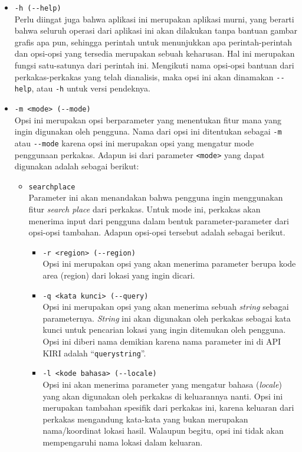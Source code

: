 \begin{itemize}
	\item \verb|-h (--help)|\\
	Perlu diingat juga bahwa aplikasi ini merupakan aplikasi \cl\xspace murni, yang berarti bahwa seluruh operasi dari aplikasi ini akan dilakukan tanpa bantuan gambar grafis apa pun, sehingga perintah untuk menunjukkan apa perintah-perintah dan opsi-opsi yang tersedia merupakan sebuah keharusan. Hal ini merupakan fungsi satu-satunya dari perintah ini. Mengikuti nama opsi-opsi bantuan dari perkakas-perkakas yang telah dianalisis, maka opsi ini akan dinamakan \verb|--help|, atau \verb|-h| untuk versi pendeknya.
	\newpage\vspace*{-1.5em} %
	\item \verb|-m <mode> (--mode)|\\
	Opsi ini merupakan opsi berparameter yang menentukan fitur mana yang ingin digunakan oleh pengguna. Nama dari opsi ini ditentukan sebagai \verb|-m| atau \verb|--mode| karena opsi ini merupakan opsi yang mengatur mode penggunaan perkakas. Adapun isi dari parameter \verb|<mode>| yang dapat digunakan adalah sebagai berikut:
	
	\begin{itemize}	
		\item \verb|searchplace|\\
		Parameter ini akan menandakan bahwa pengguna ingin menggunakan fitur \textit{search place} dari perkakas. Untuk mode ini, perkakas akan menerima input dari pengguna dalam bentuk parameter-parameter dari opsi-opsi tambahan. Adapun opsi-opsi tersebut adalah sebagai berikut.
		
		\begin{itemize}
			\item \verb|-r <region> (--region)|\\
			Opsi ini merupakan opsi yang akan menerima parameter berupa kode area (region) dari lokasi yang ingin dicari.
			\item \verb|-q <kata kunci> (--query)|\\
			Opsi ini merupakan opsi yang akan menerima sebuah \textit{string} sebagai parameternya. \textit{String} ini akan digunakan oleh perkakas sebagai kata kunci untuk pencarian lokasi yang ingin ditemukan oleh pengguna. Opsi ini diberi nama demikian karena nama parameter ini di API KIRI adalah ``\verb|querystring|''.
			\item \verb|-l <kode bahasa> (--locale)|\\
			Opsi ini akan menerima parameter yang mengatur bahasa (\textit{locale}) yang akan digunakan oleh perkakas di keluarannya nanti. Opsi ini merupakan tambahan spesifik dari perkakas ini, karena keluaran dari perkakas mengandung kata-kata yang bukan merupakan nama/koordinat lokasi hasil. Walaupun begitu, opsi ini tidak akan mempengaruhi nama lokasi dalam keluaran.
		\end{itemize}


\end{itemize}
\end{itemize}
